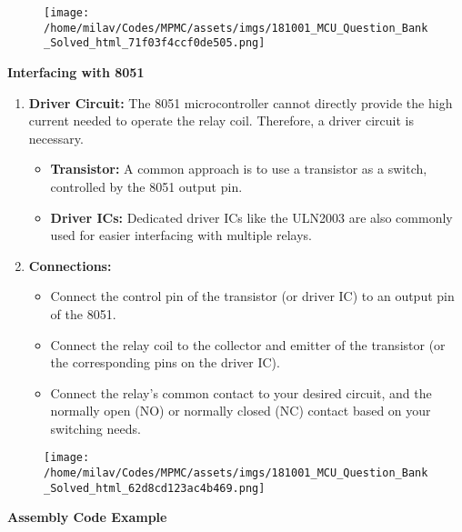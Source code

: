\documentclass[
]{article}
\begin{document}
\begin{figure}
\centering
\texttt{[image: /home/milav/Codes/MPMC/assets/imgs/181001\_MCU\_Question\_Bank\_Solved\_html\_71f03f4ccf0de505.png]}
\caption{}
\end{figure}

\textbf{Interfacing with 8051}

\begin{enumerate}
\def\labelenumi{\arabic{enumi}.}
\item
  \textbf{Driver Circuit:} The 8051 microcontroller cannot directly
  provide the high current needed to operate the relay coil. Therefore,
  a driver circuit is necessary.

  \begin{itemize}
  \item
    \textbf{Transistor:} A common approach is to use a transistor as a
    switch, controlled by the 8051 output pin.
  \item
    \textbf{Driver ICs:} Dedicated driver ICs like the ULN2003 are also
    commonly used for easier interfacing with multiple relays.
  \end{itemize}
\item
  \textbf{Connections:}

  \begin{itemize}
  \item
    Connect the control pin of the transistor (or driver IC) to an
    output pin of the 8051.
  \item
    Connect the relay coil to the collector and emitter of the
    transistor (or the corresponding pins on the driver IC).
  \item
    Connect the relay's common contact to your desired circuit, and the
    normally open (NO) or normally closed (NC) contact based on your
    switching needs.
  \end{itemize}
\end{enumerate}

\begin{figure}
\centering
\texttt{[image: /home/milav/Codes/MPMC/assets/imgs/181001\_MCU\_Question\_Bank\_Solved\_html\_62d8cd123ac4b469.png]}
\caption{}
\end{figure}

\textbf{Assembly Code Example}
\end{document}
